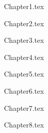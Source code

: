 \documentclass[a4paper, 11pt, oneside]{Thesis}  %
\begin{document}

\pagestyle{empty}  %



\mainmatter	  %
\pagestyle{fancy}  %


\lhead{\emph{\chapiname}}
{Chapter1.tex} %

\lhead{\emph{\chapiiname}}
{Chapter2.tex} %

\lhead{\emph{\chapiiiname}}
{Chapter3.tex} %

\lhead{\emph{\chapivname}}
{Chapter4.tex} %

\lhead{\emph{\chapvname}}
{Chapter5.tex} %

\lhead{\emph{\chapviname}}
{Chapter6.tex} %

\lhead{\emph{\chapviiname}}
{Chapter7.tex} %

\lhead{\emph{\chapviiiname}}
{Chapter8.tex} %



\appendix %




\backmatter

\label{Bibliography}
\end{document}
